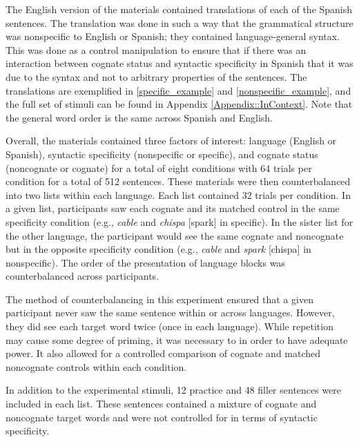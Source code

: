 The English version of the materials contained translations of each of the Spanish sentences. The translation was done in such a way that the grammatical structure was nonspecific to English or Spanish; they contained language-general syntax. This was done as a control manipulation to ensure that if there was an interaction between cognate status and syntactic specificity in Spanish that it was due to the syntax and not to arbitrary properties of the sentences.  The translations are exemplified in \ref{specific_example} and \ref{nonspecific_example}, and the full set of stimuli can be found in Appendix \ref{Appendix::InContext}. Note that the general word order is the same across Spanish and English. 

Overall, the materials contained three factors of interest: language (English or Spanish), syntactic specificity (nonspecific or specific), and cognate status (noncognate or cognate) for a total of eight conditions with 64 trials per condition for a total of 512  sentences. These materials were then counterbalanced into two lists within each language. Each list contained 32 trials per condition. In a given list, participants saw  each cognate and its matched control in the same specificity condition (e.g., \textit{cable} and \textit{chispa} [spark] in specific). In the sister list for the other language, the participant would see the same cognate and noncognate but in the opposite specificity condition (e.g., \textit{cable} and \textit{spark} [chispa] in nonspecific).  The order of the presentation of language blocks was counterbalanced across participants. 

The method of counterbalancing in this experiment ensured that a given participant never saw the same sentence within or across languages. However, they did see each target word twice (once in each language). While repetition may cause some degree of priming, it was necessary to in order to have adequate power.  It also allowed for a controlled comparison of cognate and matched noncognate controls within each condition. 

In addition to the experimental stimuli, 12 practice and 48 filler sentences were included in each list. These sentences contained a mixture of cognate and noncognate target words and were not controlled for in terms of syntactic specificity. 

